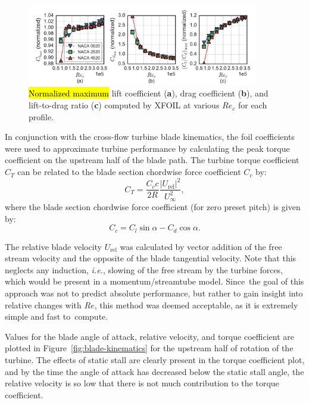 \documentclass[energies,article,accept,moreauthors,pdftex,10pt,a4paper]{mdpi}
\theoremstyle{mdpi}
\newcounter{ex}
\newcounter{re}
\begin{document}
\begin{figure}[H]
    \centering
    
    \includegraphics[width=0.9\textwidth]{figures/all_foils_re_dep}
    \caption{\hl {Normalized maximum} lift coefficient (\textbf{a}), drag coefficient
        (\textbf{b}), and lift-to-drag ratio (\textbf{c}) computed by XFOIL at
        various $Re_c$  for each profile.}
    
    \label{fig:foil-Re-dep}
\end{figure}

In conjunction with the cross-flow turbine blade kinematics, the foil
coefficients were used to approximate turbine performance by calculating the
peak torque coefficient on the upstream half of the blade path. The turbine
torque coefficient $C_T$ can be related to the blade section chordwise force
coefficient $C_c$ by:
\begin{equation}
C_T = \frac{C_c c}{2R} \frac{|U_\mathrm{rel}|^2}{U_\infty^2},
\label{eq:ct}
\end{equation}
where the blade section chordwise force coefficient (for zero preset pitch) is
given by:
\begin{equation}
C_c = C_l \sin \alpha - C_d \cos \alpha.
\label{eq:cc}
\end{equation}

The relative blade velocity $U_\mathrm{rel}$ was calculated by vector addition
of the free stream velocity and the opposite of the blade tangential velocity.
Note that this neglects any induction, \emph{i.e.}, slowing of the free stream
by the turbine forces, which would be present in a momentum/streamtube model.
Since~the goal of this approach was not to predict absolute performance, but
rather to gain insight into relative changes with $Re$, this method was deemed
acceptable, as it is extremely simple and fast to~compute.

Values for the blade angle of attack, relative velocity, and torque coefficient
are plotted in Figure~\ref{fig:blade-kinematics} for the upstream half of
rotation of the turbine. The effects of static stall are clearly present in the
torque coefficient plot, and by the time the angle of attack has decreased below
the static stall angle, the relative velocity is so low that there is not much
contribution to the torque coefficient.
\end{document}
